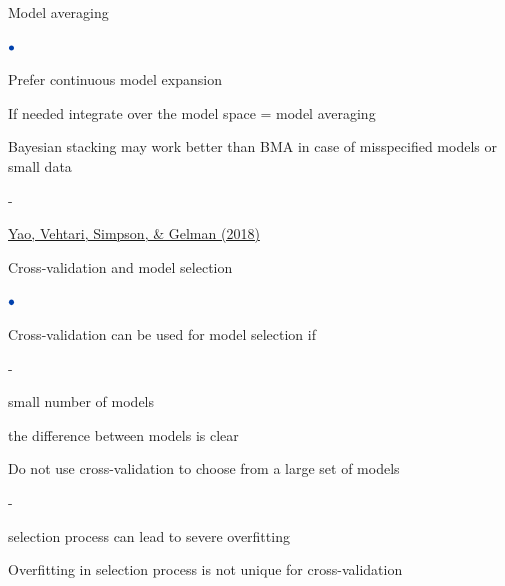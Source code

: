 \documentclass[english,t]{beamer}
\newenvironment{list1}{
   \begin{list}{$\color{list1}\bullet$}{\itemsep=6pt}}{
  \end{list}}
\newenvironment{list2}{
  \begin{list}{-}{\baselineskip=12pt\itemsep=2pt}}{
  \end{list}}
\begin{document}
\begin{frame}{Model averaging}
  
  \begin{list1}
  \item<+-> Prefer continuous model expansion
  \item<+-> If needed integrate over the model space = model averaging
  \item<+-> Bayesian stacking may work better than BMA in case of
    misspecified models or small data
    \begin{list2}
    \item \href{https://projecteuclid.org/euclid.ba/1516093227}{Yao, Vehtari, Simpson, \& Gelman (2018)}
    \end{list2}
  \end{list1}
  
\end{frame}

\begin{frame}{ Cross-validation and model selection}

  \begin{list1}
  \item<1-> Cross-validation can be used for model selection if
    \begin{list2}
      \item small number of models
      \item the difference between models is clear
    \end{list2}
  \item<2-> Do not use cross-validation to choose from a large set of models
    \begin{list2}
    \item selection process can lead to severe overfitting
    \end{list2}
  \item<3-> Overfitting in selection process is not unique for cross-validation
  \end{list1}
\end{frame}
\end{document}
